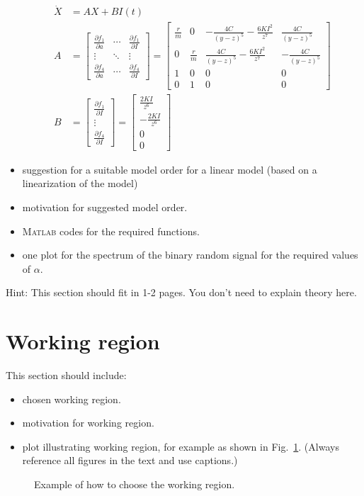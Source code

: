\documentclass[10pt,a4paper]{article}
\begin{document}
\begin{itemize}
\begin{align*}
		\dot{X} &= A X + B I(t) \\
		A &= \begin{bmatrix} \frac{\partial f_{1}}{\partial a} & \cdots & \frac{\partial f_{1}}{\partial I} \\ \vdots & \ddots & \vdots \\ \frac{\partial f_{4}}{\partial a} & \cdots & \frac{\partial f_{4}}{\partial I} \end{bmatrix} = \begin{bmatrix} \frac{r}{m} & 0 & - \frac{4 C}{(y - z)^{5}} - \frac{6 K I^{2}}{z^{7}} & \frac{4 C}{(y - z)^{5}} \\ 0 & \frac{r}{m} & \frac{4 C}{(y - z)^{5}} - \frac{6 K I^{2}}{z^{7}} & - \frac{4 C}{(y - z)^{5}} \\ 1 & 0 & 0 & 0 \\ 0 & 1 & 0 & 0 \end{bmatrix} \\ 
		B &= \begin{bmatrix} \frac{\partial f_{1}}{\partial I} \\ \vdots \\ \frac{\partial f_{4}}{\partial I} \end{bmatrix} = \begin{bmatrix} \frac{2 K I}{z^{6}} \\ - \frac{2 K I}{z^{6}} \\ 0 \\ 0 \end{bmatrix}
	\end{align*}
    \item suggestion for a suitable model order for a linear model (based on a linearization of the model)
    \item motivation for suggested model order.
    \item \textsc{Matlab} codes for the required functions.
    \item one plot for the spectrum of the binary random signal for the required values of $\alpha$.
\end{itemize}
Hint: This section should fit in 1-2 pages. You don't need to explain theory here.

\section{Working region}
This section should include:
\begin{itemize}
    \item chosen working region.
    \item motivation for working region.
    \item plot illustrating working region, for example as shown in Fig.~\ref{fig:workingRegion}. (Always reference all figures in the text and use captions.)
\end{itemize}
%
\begin{figure}[ht]
\footnotesize
\centering 
\def\svgwidth{.8\columnwidth}
 
\caption{Example of how to choose the working region.}
\label{fig:workingRegion}
\end{figure}
\end{document}
